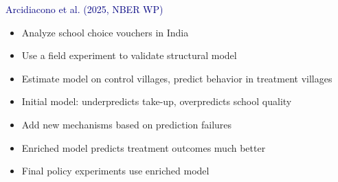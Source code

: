 \documentclass[aspectratio=169]{beamer}
\begin{document}
\begin{frame}

\textcolor{navy}{Arcidiacono et al. (2025, NBER WP)}

\bigskip{}

\begin{itemize}
\itemsep1.5em
\item<2-> Analyze school choice vouchers in India
\item<3-> Use a field experiment to validate structural model
\item<4-> Estimate model on control villages, predict behavior in treatment villages
\item<5-> Initial model: underpredicts take-up, overpredicts school quality
\item<6-> Add new mechanisms based on prediction failures
\item<7-> Enriched model predicts treatment outcomes much better
\item<8-> Final policy experiments use enriched model
\end{itemize}

\end{frame}
\end{document}
